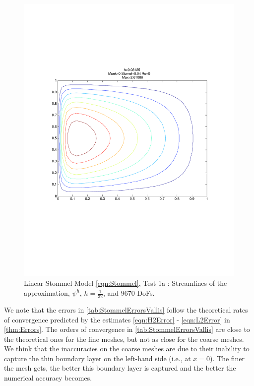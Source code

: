 \begin{figure}[H]
  \begin{center}
    \includegraphics[trim=0 200 20 220, clip=true, scale=0.5]{LinearStommelVallis.pdf}
    \caption{Linear Stommel Model \eqref{eqn:Stommel}, Test 1a \cite{Vallis06}: Streamlines of the approximation,
    $\psi^h$, $h=\frac{1}{32}$, and $9670$ DoFs.}
    \label{fig:StommelVallis}
  \end{center}
\end{figure}
We note that the errors in \autoref{tab:StommelErrorsVallis} follow the theoretical rates of
convergence predicted by the estimates \eqref{eqn:H2Error} - \eqref{eqn:L2Error} in
\autoref{thm:Errors}. The orders of convergence in \autoref{tab:StommelErrorsVallis} are close to
the theoretical ones for the fine meshes, but not as close for the coarse meshes. We think that the
inaccuracies on the coarse meshes are due to their inability to capture the thin boundary layer on
the left-hand side (i.e., at $x=0$). The finer the mesh gets, the better this boundary layer is
captured and the better the numerical accuracy becomes.


